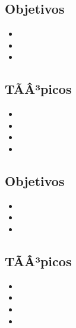 \subsection*{Objetivos}
\begin{itemize}
	\item \OSOCHOObjUNO
	\item \OSOCHOObjDOS
	\item \OSOCHOObjTRES
\end{itemize}

\subsection{\OSNUEVEDef}\label{sec:BOK-OS9}

\subsection*{TÃÂ³picos}
\begin{itemize}
	\item \OSNUEVETopicPlaneamiento
	\item \OSNUEVETopicRequerimientos
	\item \OSNUEVETopicFallos
	\item \OSNUEVETopicPreocupaciones
\end{itemize}

\subsection*{Objetivos}
\begin{itemize}
	\item \OSNUEVEObjUNO
	\item \OSNUEVEObjDOS
	\item \OSNUEVEObjTRES
\end{itemize}

\subsection{\OSDIEZDef}\label{sec:BOK-OS10}

\subsection*{TÃÂ³picos}
\begin{itemize}
	\item \OSDIEZTopicConceptos
	\item \OSDIEZTopicRedundancia
	\item \OSDIEZTopicMetodos
	\item \OSDIEZTopicEjemplos
\end{itemize}

